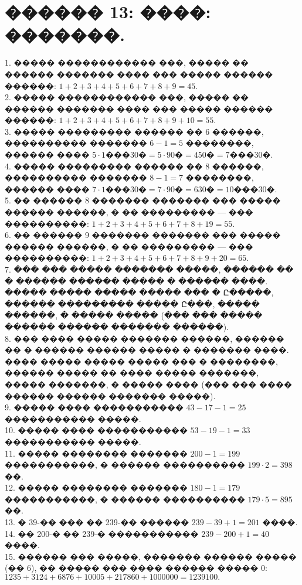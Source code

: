 \documentclass[12pt]{article}
\begin{document}
\section{������ 13: ����: �������.}
1. ����� ������������ ���, ����� �� ������ ������� ���� ��� ����� ������ ������: $1+2+3+4+5+6+7+8+9=45.$\\
2. ����� ������������ ���, ����� �� ������ ������� ���� ��� ����� ������ ������: $1+2+3+4+5+6+7+8+9+10=55.$\\
3. ����� ��������� ������ �� 6 ������, ���������� ������� $6-1=5$ ��������, ������ ���� $5\cdot1\text{���}30\text{�}=5\cdot90\text{�}=450\text{�}=7\text{���}30\text{�}.$\\
4. ����� ��������� ������ �� 8 ������, ���������� ������� $8-1=7$ ��������, ������ ���� $7\cdot1\text{���}30\text{�}=7\cdot90\text{�}=630\text{�}=10\text{���}30\text{�}.$\\
5. �� ������ 8 ������� ������� ��� ����� ������ ������, � �� ��������� --- ��� ����������: $1+2+3+4+5+6+7+8+19=55.$\\
6. �� ������ 9 ������� ������� ��� ����� ������ ������, � �� ��������� --- ��� ����������: $1+2+3+4+5+6+7+8+9+20=65.$\\
7. ��� ��� ����� ������� �����, ������ �� � ������ ������ ����� � ������ ����. ����� ����� ����� ����� ��� � Ը�����, ������ ��������� ����� Ը���, ����� ������, � ����� ����� (��� ��� ����� ������ ������ ������� ������).\\
8. ��� ���� ����� ������� ������, ������ �� � ������ ������ ����� � ������� ����. ���� ����� ����� ����� ��� � ��������, ������ ����� �� ���� ����� �������, ����� �������, � ����� ���� (��� ��� ���� ������ ������ ������� �����).\\
9. ����� ���� ����������� $43-17-1=25$ ����������� �����.\\
10. ����� ���� ����������� $53-19-1=33$ ����������� �����.\\
11. ����� �������� ������� $200-1=199$ �����������, � ������ ���������� $199\cdot2=398$��.\\
12. ����� �������� ������� $180-1=179$ �����������, � ������ ���������� $179\cdot5=895$��.\\
13. � 39-�� ��� �� 239-�� ������ $239-39+1=201$ ����.\\
14. �� 200-� �� 239-� ����������� $239-200+1=40$ ����.\\
15. ������ ��� �����, ������� ������ ����� (�� 6), �� ����� ��� ���� ������ ����� 0: $1235+3124+6876+10005+217860+1000000=1239100.$\\
\end{document}
